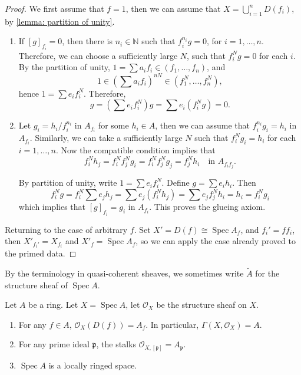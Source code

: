 \documentclass[11pt]{article}
\newcommand{\Spec}{\operatorname{Spec}}
\begin{document}
\begin{proof}
    We first assume that $ f = 1 $, then we can assume that $ X = \bigcup_{i=1}^{n} D(f_{i}) $, 
    by \autoref{lemma: partition of unity}. 

    \begin{enumerate}[label = (\alph*)]
        \item If $ [g]_{f_{i}}=0 $, then there is $ n_{i} \in \mathbb{N} $ such that $ f_{i}^{n_{i}}g=0 $, 
        for $ i=1, \dots,n $. 
        Therefore, we can choose a sufficiently large $ N $, such that $ f_{i}^{N}g=0 $ for each $ i $. 
        By the partition of unity, $ 1 = \sum a_{i}f_{i} \in (f_{1},\dots,f_{n}) $, 
        and $$ 1 \in (\sum a_{i}f_{i})^{nN} \in (f_{1}^{N},\dots,f_{n}^{N}), $$ hence 
        $ 1 = \sum e_{i}f_{i}^{N} $. 
        Therefore, $$ g = (\sum e_{i}f_{i}^{N}) g = \sum e_{i}(f_{i}^{N}g) = 0. $$ 

        \item Let $ g_{i} = h_{i} / f_{i}^{n_{i}} $ in $ A_{f_{i}} $ for some $ h_{i} \in A $, 
        then we can assume that $ f_{i}^{n_{i}}g_{i}=h_{i} $ in $ A_{f_{i}} $. 
        Similarly, we can take a sufficiently large $ N $ such that $ f_{i}^{N}g_{i} = h_{i} $ 
        for each $ i=1,\dots, n $. Now the compatible condition implies that 
        $$ f_{i}^{N} h_{j} =  f_{i}^{N}f_{j}^{N} g_{i} = f_{i}^{N}f_{j}^{N} g_{j} = f_{j}^{N}h_{i} 
        \quad \text{in } A_{f_{i}f_{j}}. $$
        
        By partition of unity, write $ 1 = \sum e_{i}f_{i}^{N} $. Define $ g = \sum e_{i}h_{i} $. 
        Then $$ f_{i}^{N}g = f_{i}^{N} \sum e_{j}h_{j} = \sum e_{j}(f_{i}^{N}h_{j})= 
         \sum e_{j} f_{j}^{N}h_{i} = h_{i} = f_{i}^{N}g_{i} $$ 
        which implies that $ [g]_{f_{i}}=g_{i} $ in $ A_{f_{i}} $. 
        This proves the glueing axiom. 
    \end{enumerate}

    Returning to the case of arbitrary $ f $. Set $ X' = D(f) \cong \Spec A_{f} $, 
    and $ f_{i}' = f f_{i} $, then $ X'_{f_{i}'}=X_{f_{i}} $ and $ X'_{f}=\Spec A_{f} $, 
    so we can apply the case already proved to the primed data.  
\end{proof}

By the terminology in quasi-coherent sheaves, 
we sometimes write $ \widetilde{A} $ for the structure sheaf of $ \Spec A $. 

\begin{corollary}
    \cite[Proposition II.2.2]{hartsAG}
    Let $ A $ be a ring. Let $ X =\Spec A $, 
    let $ \mathscr{O}_{X} $ be the structure sheaf on $ X $. 
    \begin{enumerate}
        \item For any $ f \in A $, $ \mathscr{O}_{X}(D(f))=A_{f} $. 
            In particular, $ \Gamma(X,\mathscr{O}_{X})=A $. 
        \item For any prime ideal $ \mathfrak{p} $, 
            the stalks $ \mathscr{O}_{X,[\mathfrak{p}]}=A_{\mathfrak{p}} $. 
        \item $ \Spec A $ is a locally ringed space. 
    \end{enumerate}
\end{corollary}
\end{document}
